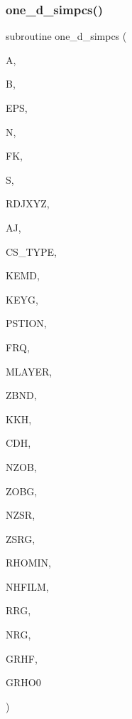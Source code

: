 \subsubsection{\texorpdfstring{one\+\_\+d\+\_\+simpcs()}{one\_d\_simpcs()}}
{\footnotesize\ttfamily subroutine one\+\_\+d\+\_\+simpcs (\begin{DoxyParamCaption}\item[{real, intent(in)}]{A,  }\item[{real, intent(in)}]{B,  }\item[{real, intent(in)}]{E\+PS,  }\item[{integer}]{N,  }\item[{external}]{FK,  }\item[{complex, dimension(6), intent(out)}]{S,  }\item[{real, intent(in)}]{R\+D\+J\+X\+YZ,  }\item[{real, intent(in)}]{AJ,  }\item[{integer, intent(in)}]{C\+S\+\_\+\+T\+Y\+PE,  }\item[{integer, intent(in)}]{K\+E\+MD,  }\item[{integer, intent(in)}]{K\+E\+YG,  }\item[{real, dimension(10), intent(in)}]{P\+S\+T\+I\+ON,  }\item[{real, intent(in)}]{F\+RQ,  }\item[{integer, intent(in)}]{M\+L\+A\+Y\+ER,  }\item[{real, dimension(0\+:mlayer), intent(in)}]{Z\+B\+ND,  }\item[{complex, dimension(0\+:mlayer), intent(in)}]{K\+KH,  }\item[{complex, dimension(0\+:mlayer), intent(in)}]{C\+DH,  }\item[{integer, intent(in)}]{N\+Z\+OB,  }\item[{real, dimension(nzob), intent(in)}]{Z\+O\+BG,  }\item[{integer, intent(in)}]{N\+Z\+SR,  }\item[{real, dimension(2,nzsr), intent(in)}]{Z\+S\+RG,  }\item[{real, intent(in)}]{R\+H\+O\+M\+IN,  }\item[{integer, intent(in)}]{N\+H\+F\+I\+LM,  }\item[{real, dimension(nrg), intent(in)}]{R\+RG,  }\item[{integer, intent(in)}]{N\+RG,  }\item[{complex, dimension(11,nhfilm,nzsr,nzob), intent(in)}]{G\+R\+HF,  }\item[{complex, dimension(4,nzsr,nzob), intent(in)}]{G\+R\+H\+O0 }\end{DoxyParamCaption})}

